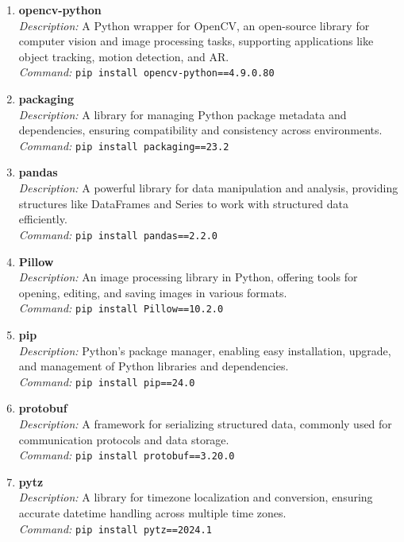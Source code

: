 \begin{enumerate}
	\item \textbf{opencv-python} \\
	\emph{Description:} A Python wrapper for OpenCV, an open-source library for computer vision and image processing tasks, supporting applications like object tracking, motion detection, and AR. \\
	\emph{Command:} \texttt{pip install opencv-python==4.9.0.80}
	
	\item \textbf{packaging} \\
	\emph{Description:} A library for managing Python package metadata and dependencies, ensuring compatibility and consistency across environments. \\
	\emph{Command:} \texttt{pip install packaging==23.2}
	
	\item \textbf{pandas} \\
	\emph{Description:} A powerful library for data manipulation and analysis, providing structures like DataFrames and Series to work with structured data efficiently. \\
	\emph{Command:} \texttt{pip install pandas==2.2.0}
	
	\item \textbf{Pillow} \\
	\emph{Description:} An image processing library in Python, offering tools for opening, editing, and saving images in various formats. \\
	\emph{Command:} \texttt{pip install Pillow==10.2.0}
	
	\item \textbf{pip} \\
	\emph{Description:} Python’s package manager, enabling easy installation, upgrade, and management of Python libraries and dependencies. \\
	\emph{Command:} \texttt{pip install pip==24.0}
	
	\item \textbf{protobuf} \\
	\emph{Description:} A framework for serializing structured data, commonly used for communication protocols and data storage. \\
	\emph{Command:} \texttt{pip install protobuf==3.20.0}
	
	\item \textbf{pytz} \\
	\emph{Description:} A library for timezone localization and conversion, ensuring accurate datetime handling across multiple time zones. \\
	\emph{Command:} \texttt{pip install pytz==2024.1}
	

\end{enumerate}
